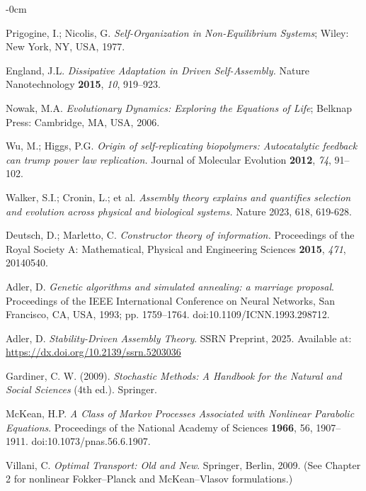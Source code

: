 \documentclass[life,article,submit,pdftex,moreauthors]{Definitions/mdpi}
\begin{document}
\begin{adjustwidth}{-\extralength}{0cm}
{\begin{thebibliography}{999}
Prigogine, I.; Nicolis, G. \textit{Self-Organization in Non-Equilibrium Systems}; Wiley: New York, NY, USA, 1977.

England, J.L. \textit{Dissipative Adaptation in Driven Self-Assembly.} Nature Nanotechnology \textbf{2015}, \textit{10}, 919–923.

Nowak, M.A. \textit{Evolutionary Dynamics: Exploring the Equations of Life}; Belknap Press: Cambridge, MA, USA, 2006.


Wu, M.; Higgs, P.G. \textit{Origin of self-replicating biopolymers: Autocatalytic feedback can trump power law replication.} Journal of Molecular Evolution \textbf{2012}, \textit{74}, 91–102.

Walker, S.I.; Cronin, L.; et al. \textit{Assembly theory explains and quantifies selection and evolution across physical and biological systems.} Nature 2023, 618, 619-628.

Deutsch, D.; Marletto, C. \textit{Constructor theory of information.} Proceedings of the Royal Society A: Mathematical, Physical and Engineering Sciences \textbf{2015}, \textit{471}, 20140540.

Adler, D. \textit{Genetic algorithms and simulated annealing: a marriage proposal}. Proceedings of the IEEE International Conference on Neural Networks, San Francisco, CA, USA, 1993; pp. 1759--1764. doi:10.1109/ICNN.1993.298712.

Adler, D.
\textit{Stability-Driven Assembly Theory}.
SSRN Preprint, 2025. Available at: \url{https://dx.doi.org/10.2139/ssrn.5203036}

 Gardiner, C. W. (2009). \textit{Stochastic Methods: A Handbook for the Natural and Social Sciences} (4th ed.). Springer.

McKean, H.P. 
\textit{A Class of Markov Processes Associated with Nonlinear Parabolic Equations}. 
Proceedings of the National Academy of Sciences \textbf{1966}, 56, 1907–1911. doi:10.1073/pnas.56.6.1907.

Villani, C. 
\textit{Optimal Transport: Old and New}. Springer, Berlin, 2009. 
(See Chapter 2 for nonlinear Fokker–Planck and McKean–Vlasov formulations.)


\end{thebibliography}}
\end{adjustwidth}
\end{document}
